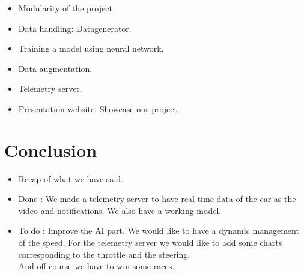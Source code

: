 \documentclass[11pt]{article}
\begin{document}
\begin{itemize}

\item Modularity of the project %
\item Data handling: Datagenerator. %
\item Training a model using neural network. %
\item Data augmentation. %
\item Telemetry server. %
\item Presentation website: Showcase our project. %

\end{itemize}

\section {Conclusion}

\begin{itemize}
\item Recap of what we have said.
\item Done : We made a telemetry server to have real time data of the car as the video and notifications. We also have a working model.

\item To do : Improve the AI part. We would like to have a dynamic management of the speed. For the telemetry server we would like to add some charts corresponding to the throttle and the steering. \\
And off course we have to win some races.

\end{itemize}
\end{document}

